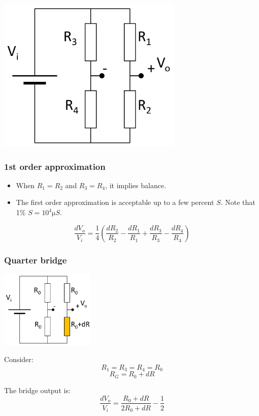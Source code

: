 \documentclass[11pt]{article}
\begin{document}
\begin{center}
\includegraphics[height=20em]{./images/strain-gauges-wheatstone-bridge-circuit-diagram.png}
\end{center}
\subsubsection{1st order approximation}
\label{sec:org1b7a65f}
\begin{itemize}
\item When \(R_1 = R_2\) and \(R_3 = R_4\), it implies balance.
\item The first order approximation is acceptable up to a few percent \(\unit{S}\). Note that 1\% \(\unit{S} = 10^4 \unit{\micro S}\).
\end{itemize}

\[\frac{dV_o}{V_i} = \frac{1}{4} \left(\frac{dR_2}{R_2} - \frac{dR_1}{R_1} + \frac{dR_3}{R_3} - \frac{dR_4}{R_4} \right)\]
\subsubsection{Quarter bridge}
\label{sec:org6041656}
\begin{center}
\includegraphics[height=10em]{./images/quarter-bridge-circuit-diagram.png}
\end{center}
Consider:
\[R_1 = R_3 = R_4 = R_0\]
\[R_G = R_0 + dR\]

The bridge output is:
\[\frac{dV_o}{V_i} = \frac{R_0 + dR}{2 R_0 + dR} - \frac{1}{2}\]
\end{document}

